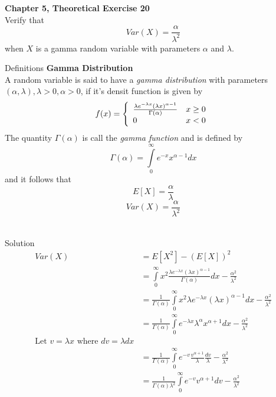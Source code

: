 \documentclass{article}
\begin{document}
\begin{spacing}{1.1}
\newpage
\begin{homeworkProblem}
  {\bf Chapter 5, Theoretical Exercise 20}\\
  Verify that
  \[Var( X) = \frac{ \alpha}{ \lambda^2}\]
  when $X$ is a gamma random variable with parameters $\alpha$ and $\lambda$.
  \begin{homeworkSection}{Definitions}
    {\bf Gamma Distribution}\\
    A random variable is said to have a \emph{gamma distribution} with parameters
    $(\alpha, \lambda), \lambda > 0, \alpha > 0$, if it's densit function
    is given by
    \[
      f( x) = \left\{
        \begin{array}{l l}
        \frac{ \lambda e^{-\lambda x} (\lambda x)^{\alpha - 1}}
             { \Gamma( \alpha)} &x \ge 0\\
        0 &x < 0 
        \end{array} \right.
    \]
    The quantity $\Gamma( \alpha)$ is call the \emph{gamma function}
    and is defined by
      \[\Gamma( \alpha) = \int\limits_0^\infty e^{-x} x^{\alpha - 1} dx\]
    and it follows that
      \[E[ X] = \frac{ \alpha}{ \lambda}\]
      \[Var(X) = \frac{ \alpha}{ \lambda^2}\]\\
  \end{homeworkSection}
  \begin{homeworkSection}{Solution}
    \begin{align*}
      Var( X) &= E[ X^2] - (E[ X])^2\\
      &= \int\limits_0^\infty x^2 \frac{ \lambda e^{-\lambda x} (\lambda x)^{\alpha - 1}}
        {\Gamma( \alpha)} dx - \frac{ \alpha^2}{ \lambda^2}\\
      &= \frac{ 1}{ \Gamma( \alpha)} \int\limits_0^\infty x^2
        \lambda e^{-\lambda x} (\lambda x)^{\alpha - 1} dx - \frac{ \alpha^2}{ \lambda^2}\\
      &= \frac{ 1}{ \Gamma( \alpha)} \int\limits_0^\infty
        e^{-\lambda x} \lambda^\alpha x^{\alpha + 1} dx - \frac{ \alpha^2}{ \lambda^2}\\
      \text{Let $v = \lambda x$ where $dv = \lambda d x$}\\
      &= \frac{ 1}{ \Gamma( \alpha)} \int\limits_0^\infty
        e^{-v} \frac{ v^{\alpha + 1}}{ \lambda} \frac{dv}{ \lambda} - \frac{ \alpha^2}{ \lambda^2}\\
      &= \frac{ 1}{ \Gamma( \alpha) \lambda^2} \int\limits_0^\infty
        e^{-v} v^{\alpha + 1} dv - \frac{ \alpha^2}{ \lambda^2}\\

\end{align*}
\end{homeworkSection}
\end{homeworkProblem}
\end{spacing}
\end{document}
